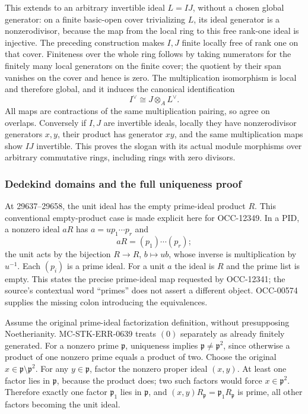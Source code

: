 This extends to an arbitrary invertible ideal \(L=IJ\), without a chosen global generator: on a finite basic-open cover trivializing \(L\), its ideal generator is a nonzerodivisor, because the map from the local ring to this free rank-one ideal is injective. The preceding construction makes \(I,J\) finite locally free of rank one on that cover. Finiteness over the whole ring follows by taking numerators for the finitely many local generators on the finite cover; the quotient by their span vanishes on the cover and hence is zero. The multiplication isomorphism is local and therefore global, and it induces the canonical identification \[
 I^\vee\cong J\otimes_A L^\vee.
\] All maps are contractions of the same multiplication pairing, so agree on overlaps. Conversely if \(I,J\) are invertible ideals, locally they have nonzerodivisor generators \(x,y\), their product has generator \(xy\), and the same multiplication maps show \(IJ\) invertible. This proves the slogan with its actual module morphisms over arbitrary commutative rings, including rings with zero divisors.

\subsubsection{Dedekind domains and the full uniqueness proof}\label{algebra-proof-029-dedekind-domains-and-the-full-uniqueness-proof}

At 29637--29658, the unit ideal has the empty prime-ideal product \(R\). This conventional empty-product case is made explicit here for OCC-12349. In a PID, a nonzero ideal \(aR\) has \(a=u p_1\cdots p_r\) and \[
 aR=(p_1)\cdots(p_r);
\] the unit acts by the bijection \(R\to R\), \(b\mapsto ub\), whose inverse is multiplication by \(u^{-1}\). Each \((p_i)\) is a prime ideal. For a unit \(a\) the ideal is \(R\) and the prime list is empty. This states the precise prime-ideal map requested by OCC-12341; the source's contextual word ``primes'' does not assert a different object. OCC-00574 supplies the missing colon introducing the equivalences.

Assume the original prime-ideal factorization definition, without presupposing Noetherianity. MC-\AlgebraIdentifierBreak{}STK-\AlgebraIdentifierBreak{}ERR-\AlgebraIdentifierBreak{}0639 treats \((0)\) separately as already finitely generated. For a nonzero prime \(\mathfrak p\), uniqueness implies \(\mathfrak p\ne\mathfrak p^2\), since otherwise a product of one nonzero prime equals a product of two. Choose the original \(x\in\mathfrak p\setminus\mathfrak p^2\). For any \(y\in\mathfrak p\), factor the nonzero proper ideal \((x,y)\). At least one factor lies in \(\mathfrak p\), because the product does; two such factors would force \(x\in\mathfrak p^2\). Therefore exactly one factor \(\mathfrak p_1\) lies in \(\mathfrak p\), and \((x,y)R_{\mathfrak p}=\mathfrak p_1R_{\mathfrak p}\) is prime, all other factors becoming the unit ideal.

